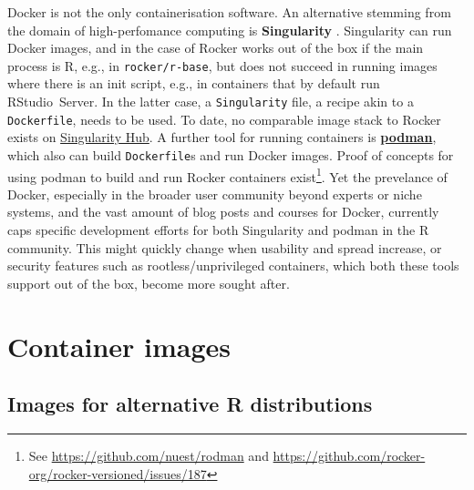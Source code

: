 Docker is not the only containerisation software. An alternative
stemming from the domain of high-perfomance computing is
\textbf{Singularity} \citep{kurtzer_singularity_2017}. Singularity can
run Docker images, and in the case of Rocker works out of the box if the
main process is R, e.g., in \texttt{rocker/r-base}, but does not succeed
in running images where there is an init script, e.g., in containers
that by default run RStudio~Server. In the latter case, a
\texttt{Singularity} file, a recipe akin to a \texttt{Dockerfile}, needs
to be used. To date, no comparable image stack to Rocker exists on
\href{https://singularity-hub.org/}{Singularity Hub}. A further tool for
running containers is
\href{https://github.com/containers/libpod}{\textbf{podman}}, which also
can build \texttt{Dockerfile}s and run Docker images. Proof of concepts
for using podman to build and run Rocker containers
exist\footnote{See \href{https://github.com/nuest/rodman}{https://github.com/nuest/rodman} and \href{https://github.com/rocker-org/rocker-versioned/issues/187}{https://github.com/rocker-org/rocker-versioned/issues/187}}.
Yet the prevelance of Docker, especially in the broader user community
beyond experts or niche systems, and the vast amount of blog posts and
courses for Docker, currently caps specific development efforts for both
Singularity and podman in the R community. This might quickly change
when usability and spread increase, or security features such as
rootless/unprivileged containers, which both these tools support out of
the box, become more sought after.

\hypertarget{container-images}{%
\section{Container images}\label{container-images}}

\label{images}

\hypertarget{images-for-alternative-r-distributions}{%
\subsection{Images for alternative R
distributions}\label{images-for-alternative-r-distributions}}

\label{alternatives}

